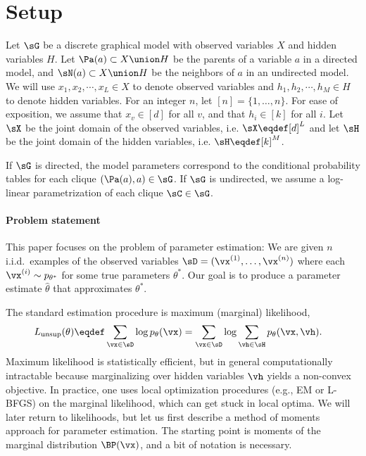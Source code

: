 \section{Setup}
\label{sec:setup}

Let $\sG$ be a discrete graphical model with observed variables $X$ and
  hidden variables $H$.
Let $\Pa(a) \subset X \union H$ be the parents of a variable $a$ in a directed
  model, and $\sN(a) \subset X \union H$ be the neighbors of $a$ in an
  undirected model.
We will use $x_1, x_2, \cdots, x_L \in X$ to denote observed variables and
  $h_1, h_2, \cdots, h_M \in H$ to denote hidden variables.
For an integer $n$, let $[n] = \{ 1, \dots, n \}$.
For ease of exposition, we assume that $x_v \in [d]$ for
all $v$, and that $h_i \in [k]$ for all $i$.
Let $\sX$ be the joint domain of the observed variables, i.e. $\sX \eqdef [d]^L$ and
let $\sH$ be the joint domain of the hidden variables, i.e. $\sH \eqdef [k]^M$.

If $\sG$ is directed, the model parameters correspond to
the conditional probability tables for each clique $(\Pa(a), a) \in \sG$.
If $\sG$ is undirected, we assume a log-linear parametrization of each clique $\sC \in \sG$.

\paragraph{Problem statement}

This paper focuses on the problem of parameter estimation:
We are given $n$ i.i.d.~examples of the observed variables $\sD
  = (\vx^{(1)}, \dots, \vx^{(n)})$ where each $\vx^{(i)} \sim p_{\theta^*}$ for
  some true parameters $\theta^*$.
Our goal is to produce a parameter estimate $\hat\theta$ that
  approximates $\theta^*$.

The standard estimation procedure is maximum (marginal) likelihood,
  \begin{align*}
    L_\text{unsup}(\theta) &\eqdef \sum_{\vx \in \sD} \log p_\theta(\vx)
        =  \sum_{\vx \in \sD} \log \sum_{\vh \in \sH} p_\theta(\vx,\vh).
  \end{align*}
  Maximum likelihood is statistically efficient,
  but in general computationally intractable
  because marginalizing over hidden variables $\vh$ yields a non-convex objective.
In practice, one uses local optimization procedures (e.g., EM
  or L-BFGS) on the marginal likelihood, which can get stuck in local
  optima.
We will later return to likelihoods, but let us first
describe a method of moments approach for parameter estimation.
The starting point is moments of the marginal distribution $\BP(\vx)$,
and a bit of notation is necessary.

